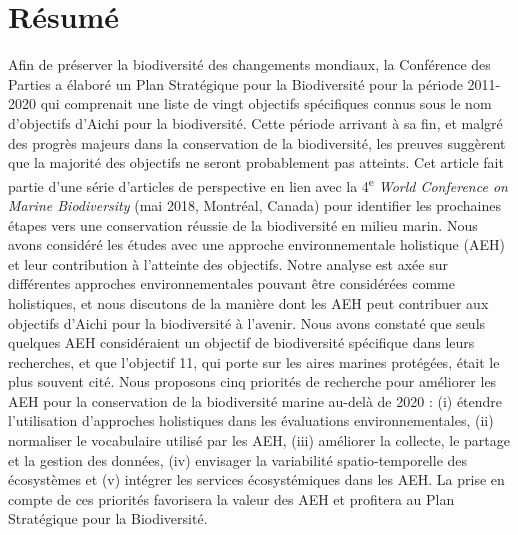 \label{ann1}
\addtocounter{chapter}{1}

\section{Résumé}
Afin de préserver la biodiversité des changements mondiaux, la Conférence des Parties a élaboré un Plan Stratégique pour la Biodiversité pour la période 2011-2020 qui comprenait une liste de vingt objectifs spécifiques connus sous le nom d'objectifs d'Aichi pour la biodiversité. Cette période arrivant à sa fin, et malgré des progrès majeurs dans la conservation de la biodiversité, les preuves suggèrent que la majorité des objectifs ne seront probablement pas atteints. Cet article fait partie d'une série d'articles de perspective en lien avec la 4\textsuperscript{e} \textit{World Conference on Marine Biodiversity} (mai 2018, Montréal, Canada) pour identifier les prochaines étapes vers une conservation réussie de la biodiversité en milieu marin. Nous avons considéré les études avec une approche environnementale holistique (AEH) et leur contribution à l'atteinte des objectifs. Notre analyse est axée sur différentes approches environnementales pouvant être considérées comme holistiques, et nous discutons de la manière dont les AEH peut contribuer aux objectifs d'Aichi pour la biodiversité à l'avenir. Nous avons constaté que seuls quelques AEH considéraient un objectif de biodiversité spécifique dans leurs recherches, et que l'objectif 11, qui porte sur les aires marines protégées, était le plus souvent cité. Nous proposons cinq priorités de recherche pour améliorer les AEH pour la conservation de la biodiversité marine au-delà de 2020 : (i) étendre l'utilisation d'approches holistiques dans les évaluations environnementales, (ii) normaliser le vocabulaire utilisé par les AEH, (iii) améliorer la collecte, le partage et la gestion des données, (iv) envisager la variabilité spatio-temporelle des écosystèmes et (v) intégrer les services écosystémiques dans les AEH. La prise en compte de ces priorités favorisera la valeur des AEH et profitera au Plan Stratégique pour la Biodiversité.

